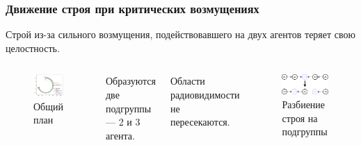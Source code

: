 \documentclass[10pt]{beamer}
\begin{document}
\begin{frame}
	\frametitle{Движение строя при критических возмущениях}
	Строй из-за сильного возмущения, подействовавшего на двух агентов теряет свою целостность.
	\begin{columns}
		\begin{figure}
			\centering
			\includegraphics[width=1\linewidth]{platoon/with-bird}
			\caption{Общий план}
			\label{fig:with-bird}
		\end{figure}
		Образуются две подгруппы — 2 и 3 агента.\par Области радиовидимости не пересекаются.
		\begin{figure}
			\centering
			\includegraphics[width=1\linewidth]{platoon/with-bird-to-groups}
			\caption{Разбиение строя на подгруппы}
			\label{fig:with-bird-to-groups}
		\end{figure} 	
	\end{columns}
\end{frame}
\end{document}
